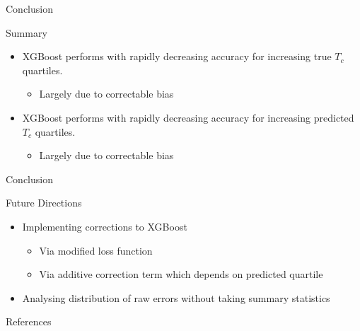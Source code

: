 \documentclass{beamer}
\begin{document}
  \begin{frame}{Conclusion}
      \begin{block}{Summary}
        \begin{itemize}
            \item XGBoost performs with rapidly decreasing accuracy for increasing true $T_c$ quartiles.
            \begin{itemize}
                \item Largely due to correctable bias
            \end{itemize}
            \item XGBoost performs with rapidly decreasing accuracy for increasing predicted $T_c$ quartiles.
            \begin{itemize}
                \item Largely due to correctable bias
            \end{itemize}
        \end{itemize}
      \end{block}
  \end{frame}
  \begin{frame}{Conclusion}
      \begin{block}{Future Directions}
        \begin{itemize}
            \item Implementing corrections to XGBoost
            \begin{itemize}
                \item Via modified loss function
                \item Via additive correction term which depends on predicted quartile
            \end{itemize}
            \item Analysing distribution of raw errors without taking summary statistics 
        \end{itemize}
      \end{block}
  \end{frame}
\begin{frame}{References}
    \printbibliography
\end{frame}
\end{document}
